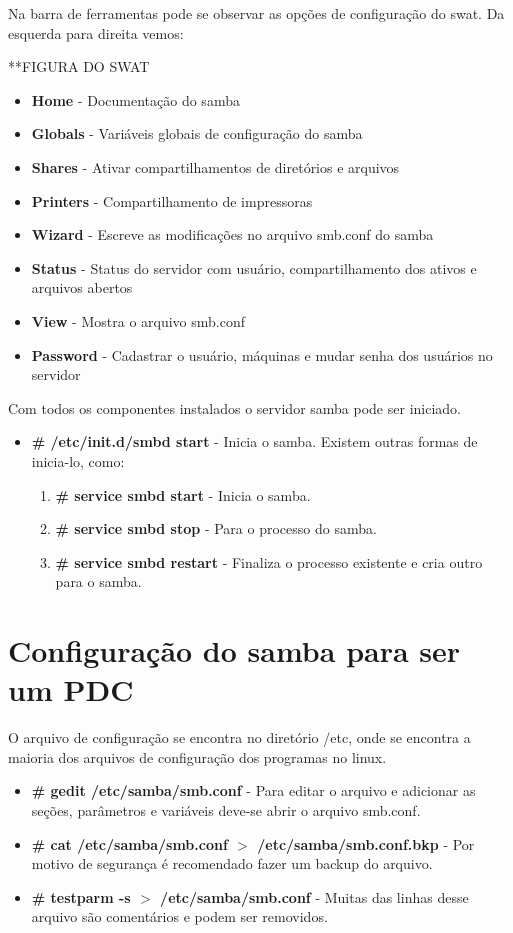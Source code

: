 Na barra de ferramentas pode se observar as opções de configuração do swat. Da esquerda para direita vemos:

**FIGURA DO SWAT

\begin{itemize}
    \item \textbf{Home} - Documentação do samba
    \item \textbf{Globals} - Variáveis globais de configuração do samba
    \item \textbf{Shares} - Ativar compartilhamentos de diretórios e arquivos
    \item \textbf{Printers} - Compartilhamento de impressoras
    \item \textbf{Wizard} - Escreve as modificações no arquivo smb.conf do samba
    \item \textbf{Status} - Status do servidor com usuário, compartilhamento dos ativos e arquivos abertos
    \item \textbf{View} - Mostra o arquivo smb.conf
    \item \textbf{Password} - Cadastrar o usuário, máquinas e mudar senha dos usuários no servidor
\end{itemize}

Com todos os componentes instalados o servidor samba pode ser iniciado.

\begin{itemize}
	\item \textbf{\# /etc/init.d/smbd start} - Inicia o samba. Existem outras formas de inicia-lo, como:
		\begin{enumerate}
			\item \textbf{\# service smbd start} - Inicia o samba.
			\item \textbf{\# service smbd stop} - Para o processo do samba.
			\item \textbf{\# service smbd restart} - Finaliza o processo existente e cria outro para o samba.
		\end{enumerate}
\end{itemize}

\section{Configuração do samba para ser um PDC}

O arquivo de configuração se encontra no diretório /etc, onde se encontra a maioria dos arquivos de configuração dos programas no linux.

\begin{itemize}
	\item \textbf{\# gedit /etc/samba/smb.conf} - Para editar o arquivo e adicionar as seções, parâmetros e variáveis deve-se abrir o arquivo smb.conf.
	\item \textbf{\# cat /etc/samba/smb.conf $>$ /etc/samba/smb.conf.bkp} - Por motivo de segurança é recomendado fazer um backup do arquivo.
	\item \textbf{\# testparm -s $>$ /etc/samba/smb.conf} - Muitas das linhas desse arquivo são comentários e podem ser removidos.
\end{itemize}


